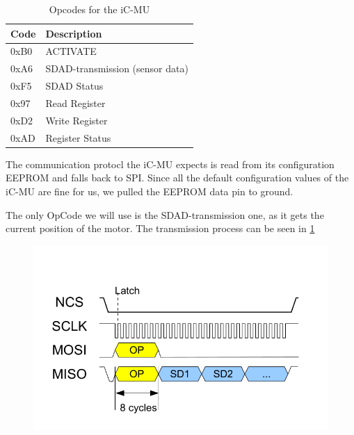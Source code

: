 \begin{table}[hp]
    \begin{tabular}{|l|l|}
        \hline
        Code & Description                     \\ \hline
        0xB0 & ACTIVATE                        \\ \hline
        0xA6 & SDAD-transmission (sensor data) \\ \hline
        0xF5 & SDAD Status                     \\ \hline
        0x97 & Read Register                   \\ \hline
        0xD2 & Write Register                  \\ \hline
        0xAD & Register Status                 \\ \hline
    \end{tabular}
    \caption{Opcodes for the iC-MU}
    \label{tab:opcodes}
\end{table}

The communication protocl the iC-MU expects is read from its configuration EEPROM and falls back to SPI.
Since all the default configuration values of the iC-MU are fine for us, we pulled the EEPROM data pin to ground.

The only OpCode we will use is the SDAD-transmission one, as it gets the current position of the motor.
The transmission process can be seen in \ref{fig:background:sdad}

\begin{figure}
    \includegraphics[width=.8\textwidth]{assets/sdad-transmission.png}
    \caption{}
    \label{fig:background:sdad}
\end{figure}
